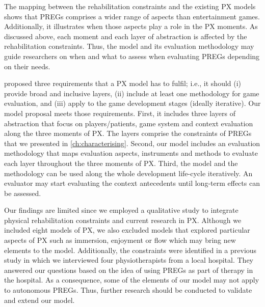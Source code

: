 The mapping between the rehabilitation constraints and the existing \ac{PX} models shows that \acp{PREG} comprises a wider range of aspects than entertainment games. Additionally, it illustrates when those aspects play a role in the \ac{PX} moments. As discussed above, each moment and each layer of abstraction is affected by the rehabilitation constraints. Thus, the model and its evaluation methodology may guide researchers on when and what to assess when evaluating \acp{PREG} depending on their needs.

\textcite{Nackea} proposed three requirements that a \ac{PX} model has to fulfil; i.e., it should (i) provide broad and inclusive layers, (ii) include at least one methodology for game evaluation, and (iii) apply to the game development stages (ideally iterative). Our model proposal meets those requirements. First, it includes three layers of abstraction that focus on players/patients, game system and context evaluation along the three moments of \ac{PX}. The layers comprise the constraints of \acp{PREG} that we presented in \autoref{ch:characterising}. Second, our model includes an evaluation methodology that maps evaluation aspects, instruments and methods to evaluate each layer throughout the three moments of \ac{PX}. Third, the model and the methodology can be used along the whole development life-cycle iteratively. An evaluator may start evaluating the context antecedents until long-term effects can be assessed.


Our findings are limited since we employed a qualitative study to integrate physical rehabilitation constraints and current research in \ac{PX}. Although we included eight models of \ac{PX}, we also excluded models that explored particular aspects of \ac{PX} such as immersion, enjoyment or flow which may bring new elements to the model. Additionally, the constraints were identified in a previous study in which we interviewed four physiotherapists from a local hospital. They answered our questions based on the idea of using \acp{PREG} as part of therapy in the hospital. As a consequence, some of the elements of our model may not apply to autonomous \acp{PREG}. Thus, further research should be conducted to validate and extend our model.


